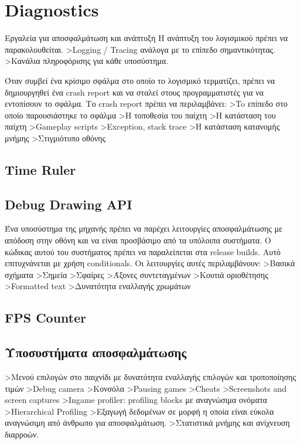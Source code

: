 \chapter{Diagnostics}
Εργαλεία για αποσφαλμάτωση και ανάπτυξη
Η ανάπτυξη του λογισμικού πρέπει να παρακολουθείται. 
>Logging / Tracing ανάλογα με το επίπεδο σημαντικότητας.
>Κανάλια πληροφόρισης για κάθε υποσύστημα.

Όταν συμβεί ένα κρίσιμο σφάλμα στο οποίο το λογισμικό τερματίζει, πρέπει να δημιουργηθεί ένα crash report και να σταλεί στους προγραμματιστές για να  εντοπίσουν το σφάλμα.
Το crash report πρέπει να περιλαμβάνει:
>To επίπεδο στο οποίο παρουσιάστηκε το σφάλμα
>Η τοποθεσία του παίχτη
>Η κατάσταση του παίχτη
>Gameplay scripts
>Exception, stack trace
>Η κατάσταση κατανομής μνήμης
>Στιγμιότυπο οθόνης

	\section{Time Ruler}
	\section{Debug Drawing API}
	Ένα υποσύστημα της μηχανής πρέπει να παρέχει λειτουργίες αποσφαλμάτωσης με απόδοση στην οθόνη και να είναι προσβάσιμο από τα υπόλοιπα συστήματα. Ο κώδικας αυτού του συστήματος πρέπει να παραλείπεται στα release builds. Αυτό επιτυχνάνεται με χρήση conditionals.
	Οι λειτουργίες αυτές περιλαμβάνουν:
	>Βασικά σχήματα
	>Σημεία
	>Σφαίρες
	>Άξονες συντεταγμένων
	>Κουτιά οριοθέτησης
	>Formatted text
	>Δυνατότητα εναλλαγής χρωμάτων
	\section{FPS Counter}
	\section{Υποσυστήματα αποσφαλμάτωσης}
	>Μενού επιλογών στο παιχνίδι με δυνατότητα εναλλαγής επιλογών και τροποποίησης τιμών
	>Debug camera
	>Κονσόλα
	>Pausing games
	>Cheats
	>Screenshots and screen captures
	>Ingame profiler: profiling blocks με αναγνώσιμα ονόματα 
	>Hierarchical Profiling
	>Εξαγωγή δεδομένων σε μορφή η οποία είναι εύκολα αναγνώσιμη από άνθρωπο για αποσφαλμάτωση.
	>Στατιστικά μνήμης και ανίχνευση διαρροών.